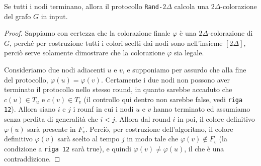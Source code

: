 \newpage

\begin{teorema}[Correttezza]
    Se tutti i nodi terminano, allora il protocollo \texttt{Rand-$2\Delta$} calcola una $2\Delta$-colorazione del grafo $G$ in input.
    \begin{proof}
        Sappiamo con certezza che la colorazione finale $\varphi$ è una $2\Delta$-colorazione di $G$, perché per costruzione tutti i colori scelti dai nodi sono nell'insieme $[2\Delta]$, perciò serve solamente dimostrare che la colorazione $\varphi$ sia legale.

        Consideriamo due nodi adiacenti $u$ e $v$, e supponiamo per assurdo che alla fine del protocollo, $\varphi(u) = \varphi(v)$. Certamente i due nodi non possono aver terminato il protocollo nello stesso round, in quanto sarebbe accaduto che $c(u) \in T_u$ e $c(v) \in T_v$ (il controllo qui dentro non sarebbe false, vedi \texttt{riga 12}). Allora siano $i$ e $j$ i rounf in cui i nodi $u$ e $v$ hanno terminato ed assumiamo senza perdita di generalità che $i < j$. Allora dal round $i$ in poi, il colore definitivo $\varphi(u)$ sarà presente in $F_v$. Perciò, per costruzione dell'algoritmo, il colore definitivo $\varphi(v)$ sarà scelto al tempo $j$ in modo tale che $\varphi(v) \notin F_v$ (la condizione a \texttt{riga 12} sarà true), e quindi $\varphi(v) \neq \varphi(u)$, il che è una contraddizione.
    \end{proof}
\end{teorema}


